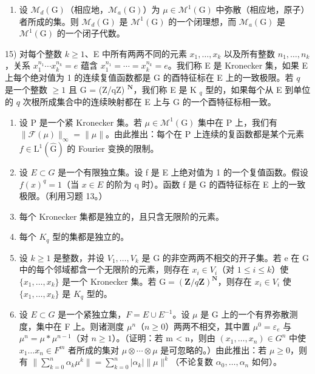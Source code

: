 \begin{enumerate}
\def\labelenumi{\alph{enumi})}
\setcounter{enumi}{1}
\tightlist
\item
  设 \(\mathcal{M}_{d}(\mathrm{G})\)（相应地，\(\mathcal{M}_{a}(\mathrm{G})\)）为 \(\mu\in\mathcal{M}^{1}(\mathrm{G})\) 中弥散（相应地，原子）者所成的集。则 \(\mathcal{M}_{d}(\mathrm{G})\) 是 \(\mathcal{M}^{1}(\mathrm{G})\) 的一个闭理想，而 \(\mathcal{M}_{a}(\mathrm{G})\) 是 \(\mathcal{M}^{1}(\mathrm{G})\) 的一个闭子代数。
\end{enumerate}

15) 对每个整数 \(k \geqslant 1\)、E 中所有两两不同的元素 \(x_1, \ldots, x_k\) 以及所有整数 \(n_1, \ldots, n_k\)，关系 \(x_1^{n_1} \cdots x_k^{n_k} = e\) 蕴含 \(x_1^{n_1} = \cdots = x_k^{n_k} = e\)。我们称 E 是 Kronecker 集，如果 E 上每个绝对值为 1 的连续复值函数都是 G 的酉特征标在 E 上的一致极限。若 \(q\) 是一个整数 \(\geqslant 1\) 且 G = (Z/qZ) \(^{\mathbf{N}}\)，我们称 E 是 K \(_q\) 型的，如果每个从 E 到单位的 \(q\) 次根所成集合中的连续映射都在 E 上与 G 的一个酉特征标相一致。

\begin{enumerate}
\def\labelenumi{\alph{enumi})}
\item
  设 P 是一个紧 Kronecker 集。若 \(\mu \in \mathcal{M}^1 (\mathrm{G})\) 集中在 P 上，我们有 \(\| \mathcal{F}(\mu)\|_{\infty} = \| \mu \|\)。由此推出：每个在 P 上连续的复函数都是某个元素 \(f\in \mathrm{L}^{1}(\widehat{\mathrm{G}})\) 的 Fourier 变换的限制。
\item
  设 \(E \subset G\) 是一个有限独立集。设 f 是 E 上绝对值为 1 的一个复值函数。假设 \(f(x)^{q} = 1\)（当 \(x \in E\) 的阶为 q 时）。函数 f 是 G 的酉特征标在 E 上的一致极限。（利用习题 13。）
\item
  每个 Kronecker 集都是独立的，且只含无限阶的元素。
\item
  每个 \(K_{q}\) 型的集都是独立的。
\item
  设 \(k \geqslant 1\) 是整数，并设 \(V_{1}, \ldots, V_{k}\) 是 G 的非空两两不相交的开子集。若 e 在 G 中的每个邻域都含一个无限阶的元素，则存在 \(x_{i} \in V_{i}\)（对 \(1 \leqslant i \leqslant k\)）使 \(\{x_{1}, \ldots, x_{k}\}\) 是一个 Kronecker 集。若 \(\mathrm{G} = (\mathbf{Z}/q\mathbf{Z})^{\mathbf{N}}\)，则存在 \(x_{i} \in V_{i}\) 使 \(\{x_{1}, \ldots, x_{k}\}\) 是 \(K_{q}\) 型的。
\item
  设 \(E \subset G\) 是一个紧独立集，\(F = E \cup E^{-1}\)。设 \(\mu\) 是 G 上的一个有界弥散测度，集中在 F 上。则诸测度 \(\mu^{n}\)（\(n \geqslant 0\)）两两不相交，其中置 \(\mu^{0} = \varepsilon_{e}\) 与 \(\mu^{n} = \mu * \mu^{n-1}\)（对 \(n \geqslant 1\)）。（证明：若 m \textless{} n，则由 \((x_{1}, \ldots, x_{n}) \in G^{n}\) 中使 \(x_{1} \ldots x_{n} \in F^{m}\) 者所成的集对 \(\mu \otimes \cdots \otimes \mu\) 是可忽略的。）由此推出：若 \(\mu \geqslant 0\)，则有 \(\| \sum_{k=0}^{n} \alpha_{k} \mu^{k} \| = \sum_{k=0}^{n} |\alpha_{k}| \| \mu \|^{k}\)（不论复数 \(\alpha_{0}, \ldots, \alpha_{n}\) 如何）。
\end{enumerate}

